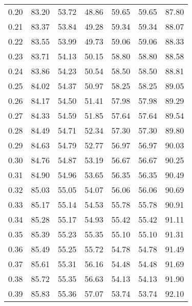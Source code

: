 \begin{tabular}{|c|c|c|c|c|c|c|}
      0.20 &     83.20 &     53.72 &      48.86 &   59.65 &      59.65 &         87.80 \\
      0.21 &     83.37 &     53.84 &      49.28 &   59.34 &      59.34 &         88.07 \\
      0.22 &     83.55 &     53.99 &      49.73 &   59.06 &      59.06 &         88.33 \\
      0.23 &     83.71 &     54.13 &      50.15 &   58.80 &      58.80 &         88.58 \\
      0.24 &     83.86 &     54.23 &      50.54 &   58.50 &      58.50 &         88.81 \\
      0.25 &     84.02 &     54.37 &      50.97 &   58.25 &      58.25 &         89.05 \\
      0.26 &     84.17 &     54.50 &      51.41 &   57.98 &      57.98 &         89.29 \\
      0.27 &     84.33 &     54.59 &      51.85 &   57.64 &      57.64 &         89.54 \\
      0.28 &     84.49 &     54.71 &      52.34 &   57.30 &      57.30 &         89.80 \\
      0.29 &     84.63 &     54.79 &      52.77 &   56.97 &      56.97 &         90.03 \\
      0.30 &     84.76 &     54.87 &      53.19 &   56.67 &      56.67 &         90.25 \\
      0.31 &     84.90 &     54.96 &      53.65 &   56.35 &      56.35 &         90.49 \\
      0.32 &     85.03 &     55.05 &      54.07 &   56.06 &      56.06 &         90.69 \\
      0.33 &     85.17 &     55.14 &      54.53 &   55.78 &      55.78 &         90.91 \\
      0.34 &     85.28 &     55.17 &      54.93 &   55.42 &      55.42 &         91.11 \\
      0.35 &     85.39 &     55.23 &      55.35 &   55.10 &      55.10 &         91.31 \\
      0.36 &     85.49 &     55.25 &      55.72 &   54.78 &      54.78 &         91.49 \\
      0.37 &     85.61 &     55.31 &      56.16 &   54.48 &      54.48 &         91.69 \\
      0.38 &     85.72 &     55.35 &      56.63 &   54.13 &      54.13 &         91.90 \\
      0.39 &     85.83 &     55.36 &      57.07 &   53.74 &      53.74 &         92.10 \\

\end{tabular}
